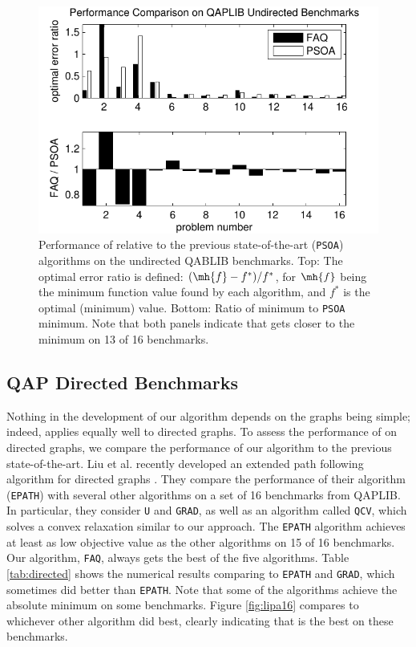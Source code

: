 \documentclass[10pt,journal,cspaper,compsoc]{IEEEtran}
\begin{document}
\begin{figure}[htbp]
	\centering
		\includegraphics[width=1.0\linewidth]{../figs/path16.pdf}
	\caption{Performance of \FAQ relative to the previous state-of-the-art (\texttt{PSOA}) algorithms on the undirected QABLIB benchmarks.  Top: The optimal error ratio is defined: $(\mh{f} - f^*)/f^*$, for $\mh{f}$ being the minimum function value found by each algorithm, and $f^*$ is the optimal (minimum) value.  Bottom: Ratio of \FAQ minimum to \texttt{PSOA} minimum.  Note that both panels indicate that \FAQ gets closer to the minimum on 13 of 16 benchmarks.}
	\label{fig:path16}
\end{figure}


\subsection{QAP Directed Benchmarks}
\label{sub:directed}

Nothing in the development of our algorithm depends on the graphs being simple; indeed, \FAQ applies equally well to directed graphs.  To assess the performance of \FAQ on directed graphs, we compare the performance of our algorithm to the previous state-of-the-art. Liu et al.  recently developed an extended path following algorithm for directed graphs \cite{Liu2012}. They compare the performance of their algorithm (\texttt{EPATH}) with several other algorithms on a set of 16 benchmarks from QAPLIB.  In particular, they consider \texttt{U} and \texttt{GRAD}, as well as an algorithm called \texttt{QCV}, which solves a convex relaxation similar to our approach.  The \texttt{EPATH} algorithm achieves at least as low objective value as the other algorithms on 15 of 16 benchmarks.  Our algorithm, \texttt{FAQ}, always gets the best of the five algorithms.  Table \ref{tab:directed} shows the numerical results comparing \FAQ to \texttt{EPATH} and \texttt{GRAD}, which sometimes did better than \texttt{EPATH}.  Note that some of the algorithms achieve the absolute minimum on some benchmarks.  Figure \ref{fig:lipa16} compares \FAQ to whichever other algorithm did best, clearly indicating that \FAQ is the best on these benchmarks.
\end{document}
